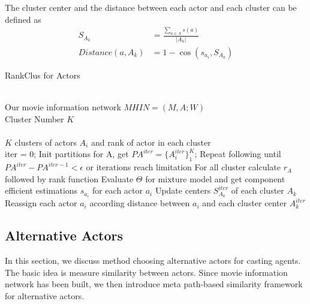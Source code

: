 The cluster center and the distance between each actor and each cluster can be defined as
\begin{subequations}
\begin{align}
  S_{A_k} &= \frac{\sum_{a \in A}s(a)}{|A_k|} \\
  Distance(a, A_k) &= 1-\cos(s_{a_i}, S_{A_k})
\end{align}
\end{subequations}

\begin{algorithm}[htb]
\renewcommand{\algorithmicrequire}{\textbf{Input:}}
\renewcommand\algorithmicensure {\textbf{Output:} }
\caption{RankClus for Actors}

\begin{algorithmic}[1]

\REQUIRE ~~\\
Our movie information network $MHIN=(M, A; W)$\\
Cluster Number $K$\\

\ENSURE ~~\\
$K$ clusters of actors $A_i$ and rank of actor in each cluster \\
\STATE iter = 0;
\STATE Init partitions for A, get $PA^{iter}=\{A_i^{iter}\}_1^K$;
\STATE Repeat following until $PA^{iter}-PA^{iter-1}<\epsilon$ or iterations reach limitation
\STATE \quad For all cluster calculate $r_A$ followed by rank function
\STATE \quad Evaluate $\Theta$ for mixture model and get component efficient estimations $s_{a_i}$ for each actor $a_i$
\STATE \quad Update centers $S_{A_k}^{iter}$ of each cluster $A_k$
\STATE \quad Reassign each actor $a_i$ according distance between $a_i$ and each cluster center $A_k^{iter}$
\end{algorithmic}
\end{algorithm}


\subsection{Alternative Actors}
In this section, we discuss method choosing alternative actors for casting agents. The basic idea is measure similarity between actors. Since movie information network has been built, we then introduce meta path-based similarity framework for alternative actors.

